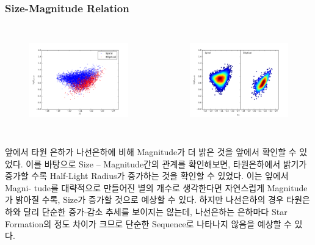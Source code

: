 \documentclass[xcolor={dvipsnames,table}]{beamer}
\newcommand\SSM{\fontsize{7}{7.2}\selectfont}
\begin{document}
\begin{frame}
 \frametitle{Size-Magnitude Relation}
 \SSM
 \begin{columns}[t]
   \begin{figure}
    \centering
    \includegraphics[width=6cm, height=4cm]{sizemag.png}
   \end{figure}
   \begin{figure}
    \centering
    \includegraphics[width=6cm, height=4cm]{sizemagdensity.png}
   \end{figure}
  \end{columns}
\vspace{0.3cm}
앞에서 타원 은하가 나선은하에 비해 Magnitude가 더 밝은 것을 앞에서 확인할 수 있었다. 이를 바탕으로 Size – Magnitude간의
관계를 확인해보면, 타원은하에서 밝기가 증가할 수록 Half-Light Radius가 증가하는 것을 확인할 수 있었다. 이는 잎에서 Magni-
tude를 대략적으로 만들어진 별의 개수로 생각한다면 자연스럽게 Magnitude가 밝아질 수록, Size가 증가할 것으로 예상할 수 있다.
하지만 나선은하의 경우 타원은하와 달리 단순한 증가-감소 추세를 보이지는 않는데, 나선은하는 은하마다 Star Formation의 정도
차이가 크므로 단순한 Sequence로 나타나지 않음을 예상할 수 있다.

 
\end{frame}
\end{document}
